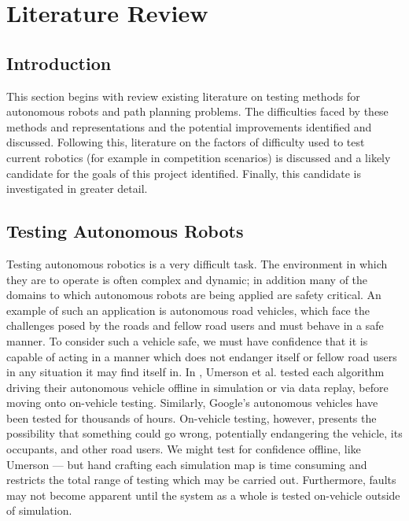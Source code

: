 \documentclass[authoryearcitations]{UoYCSproject}
\begin{document}
\chapter{Literature Review}
\label{cha:LitReview}
\section{Introduction}
\label{sec:lit0}
This section begins with review existing literature on  testing methods for autonomous robots and path planning problems. The difficulties faced by these methods and representations and the potential improvements identified and discussed. Following this, literature on the factors of difficulty used to test current robotics (for example in competition scenarios) is discussed and a likely candidate for the goals of this project identified. Finally, this candidate is investigated in greater detail.
\section{Testing Autonomous Robots}
\label{sec:lit1}
Testing autonomous robotics is a very difficult task. The environment in which they are to operate is often complex and dynamic; in addition many of the domains to which autonomous robots are being applied are safety critical. An example of such an application is autonomous road vehicles, which face the challenges posed by the roads and fellow road users and must behave in a safe manner. To consider such a vehicle safe, we must have confidence that it is capable of acting in a manner which does not endanger itself or fellow road users in any situation it may find itself in. In  \cite{umerson}, Umerson et al. tested each algorithm driving their autonomous vehicle offline in simulation or via data replay, before moving onto on-vehicle testing. Similarly, Google's autonomous vehicles have been tested for thousands of hours\cite{guizzo}. On-vehicle testing, however, presents the possibility that something could go wrong, potentially endangering the vehicle, its occupants, and other road users. We might test for confidence offline, like Umerson --- but hand crafting each simulation map is time consuming and restricts the total range of testing which may be carried out. Furthermore, faults may not become apparent until the system as a whole is tested on-vehicle outside of simulation.
\end{document}
